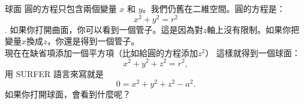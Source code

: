 \begin{surferPage}{球面}
圓的方程只包含兩個變量 $x$ 和 $y$。我們仍舊在二維空間。圓的方程是：
\[x^2+y^2=r^2\].
如果你打開曲面，你可以看到一個管子。這是因為對$z$軸上沒有限制。如果你把變量$x$換成$z$，你還是得到一個管子。\\
現在在缺省項添加一個平方項（比如給圓的方程添加$z^2$）
這樣就得到一個球面：
\[x^2+y^2+z^2=r^2,\]
用 SURFER 語言來寫就是
\[0=x^2+y^2+z^2-a^2.\]
如果你打開球面，會看到什麼呢？
\end{surferPage}
